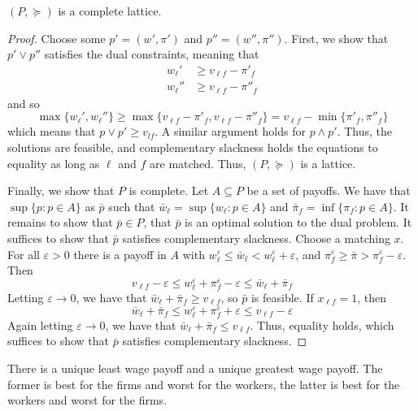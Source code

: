 \documentclass[10pt]{article}
\begin{document}
\begin{theorem}
	$(P,\succeq)$ is a complete lattice.
\end{theorem}
\begin{proof}
	Choose some $p' = (w',\pi')$ and $p'' = (w'',\pi'')$. First, we show that $p' \vee p''$ satisfies the dual constraints, meaning that 
	\begin{align*}
		w_\ell' &\ge v_{\ell f} - \pi'_f \\w_\ell'' &\ge v_{\ell f} - \pi''_f
	\end{align*}
	and so
	\[
	\max\{w_\ell',w_\ell''\} \ge \max\{ v_{\ell f} - \pi'_f, v_{\ell f} - \pi''_f\} = v_{\ell f} - \min\{\pi'_f,\pi''_f\}
	\]
	which means that $p\vee p' \ge v_{lf}$. A similar argument holds for $p \wedge p'$. Thus, the solutions are feasible, and complementary slackness holds the equations to equality as long as $\ell$ and $f$ are matched. Thus, $(P,\succeq)$ is a lattice. 
	
	Finally, we show that $P$ is complete. Let $A \subseteq P$ be a set of payoffs. We have that $\sup\{p : p \in A\}$ as $\bar{p}$ such that $\bar{w}_\ell = \sup\{w_\ell : p \in A\}$ and $\bar{\pi}_f = \inf\{\pi_f : p \in A\}$. It remains to show that $\bar{p} \in P$, \ie that $\bar{p}$ is an optimal solution to the dual problem. It suffices to show that $\bar{p}$ satisfies complementary slackness. Choose a matching $x$. For all $\varepsilon > 0$ there is a payoff in $A$ with $w^\varepsilon_\ell \le \bar{w}_\ell < w_\ell^\varepsilon + \varepsilon$, and $\pi_f^\varepsilon \ge \bar{\pi} > \pi_f^\varepsilon - \varepsilon$. Then \[v_{\ell f} - \varepsilon \le w_\ell^\varepsilon + \pi_f^\varepsilon - \varepsilon \le \bar{w}_\ell + \bar{\pi}_f\]Letting $\varepsilon \to 0$, we have that $\bar{w}_\ell + \bar{\pi}_f \ge v_{\ell f}$, so $\bar{p}$ is feasible. If $x_{\ell f} = 1$, then \[\bar{w}_\ell + \bar{\pi}_f \le w_\ell^\varepsilon + \pi_f^\varepsilon + \varepsilon \le v_{\ell f} - \varepsilon\]Again letting $\varepsilon \to 0$, we have that $\bar{w}_\ell + \bar{\pi}_f \le v_{\ell f}$. Thus, equality holds, which suffices to show that $\bar{p}$ satisfies complementary slackness.
\end{proof}

\begin{remark}
	There is a unique least wage payoff and a unique greatest wage payoff. The former is best for the firms and worst for the workers, the latter is best for the workers and worst for the firms. 
\end{remark}
\end{document}
